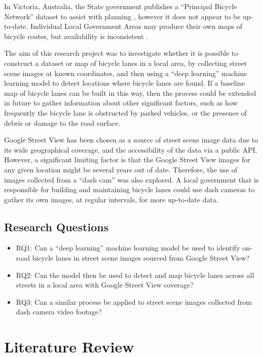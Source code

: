 \documentclass[11pt,twoside]{report}
\begin{document}
In Victoria, Australia, the State government publishes a ``Principal Bicycle Network'' dataset to assist with planning \cite{PrincipalBicycleNetwork}, however it does not appear to be up-to-date.  Individual Local Government Areas may produce their own maps of bicycle routes, but availability is inconsistent \cite{vicroads_maps}.

The aim of this research project was to investigate whether it is possible to construct a dataset or map of bicycle lanes in a local area, by collecting street scene images at known coordinates, and then using a ``deep learning'' machine learning model to detect locations where bicycle lanes are found.  If a baseline map of bicycle lanes can be built in this way, then the process could be extended in future to gather information about other significant factors, such as how frequently the bicycle lane is obstructed by parked vehicles, or the presence of debris or damage to the road surface.

Google Street View has been chosen as a source of street scene image data due to its wide geographical coverage, and the accessibility of the data via a public API.  However, a significant limiting factor is that the Google Street View images for any given location might be several years out of date.  Therefore, the use of images collected from a ``dash cam'' was also explored.  A local government that is responsible for building and maintaining bicycle lanes could use dash cameras to gather its own images, at regular intervals, for more up-to-date data.

\section{Research Questions}
\begin{itemize}
\item{RQ1: Can a ``deep learning'' machine learning model be used to identify on-road bicycle lanes in street scene images sourced from Google Street View?}
\item{RQ2: Can the model then be used to detect and map bicycle lanes across all streets in a local area with Google Street View coverage?}
\item{RQ3: Can a similar process be applied to street scene images collected from dash camera video footage?}
\end{itemize}


\chapter{Literature Review}
\end{document}

